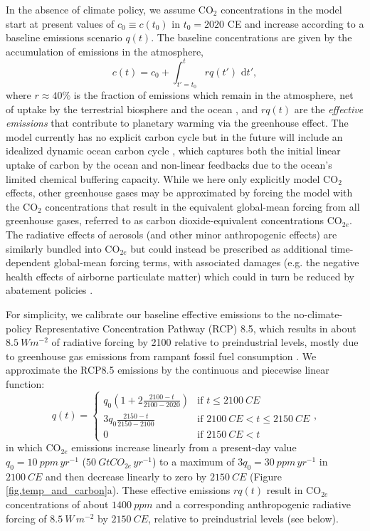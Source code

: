 \documentclass{article}
\begin{document}
In the absence of climate policy, we assume CO$_{2}$ concentrations in the model start at present values of $c_{0} \equiv c(t_{0})$ in $t_{0}=2020$ CE and increase according to a baseline emissions scenario $q(t)$. The baseline concentrations are given by the accumulation of emissions in the atmosphere,
\begin{equation}
c(t) = c_{0} + \int_{t'=t_{0}}^{t} rq(t') \text{ d}t',
\end{equation}
where $r \approx 40\%$ is the fraction of emissions which remain in the atmosphere, net of uptake by the terrestrial biosphere and the ocean \citep{solomon_irreversible_2009}, and $rq(t)$ are the \textit{effective emissions} that contribute to planetary warming via the greenhouse effect. The model currently has no explicit carbon cycle but in the future will include an idealized dynamic ocean carbon cycle \citep{glotter_simple_2014}, which captures both the initial linear uptake of carbon by the ocean and non-linear feedbacks due to the ocean's limited chemical buffering capacity. While we here only explicitly model CO$_{2}$ effects, other greenhouse gases may be approximated by forcing the model with the CO$_{2}$ concentrations that result in the equivalent global-mean forcing from all greenhouse gases, referred to as carbon dioxide-equivalent concentrations CO$_{2e}$. The radiative effects of aerosols (and other minor anthropogenic effects) are similarly bundled into CO$_{2e}$ but could instead be prescribed as additional time-dependent global-mean forcing terms, with associated damages (e.g. the negative health effects of airborne particulate matter) which could in turn be reduced by abatement policies \citep{thompson_systems_2014}.

For simplicity, we calibrate our baseline effective emissions to the no-climate-policy Representative Concentration Pathway (RCP) 8.5, which results in about $\SI{8.5}{W m^{-2}}$ of radiative forcing by 2100 relative to preindustrial levels, mostly due to greenhouse gas emissions from rampant fossil fuel consumption \citep{riahi_scenarios_2007}. We approximate the RCP8.5 emissions by the continuous and piecewise linear function:
\begin{equation}
    q(t) = 
    \begin{cases}
        q_{0}(1 + 2\frac{2100-t}{2100-2020}) &\mbox{if } t \le \SI{2100}{CE} \\
        3q_{0}\frac{2150-t}{2150-2100} &\mbox{if } \SI{2100}{CE} < t \le \SI{2150}{CE} \\
        0 &\mbox{if } \SI{2150}{CE} < t
    \end{cases},\label{eq.baseline_emissions}
\end{equation}
in which CO$_{2e}$ emissions increase linearly from a present-day value $q_{0} = \SI{10}{ppm\, yr^{-1}}$ ($\SI{50}{GtCO_{2e}\, yr^{-1}}$) to a maximum of $3q_{0} = \SI{30}{ppm\, yr^{-1}}$ in $\SI{2100}{CE}$ and then decrease linearly to zero by $\SI{2150}{CE}$ (Figure \ref{fig.temp_and_carbon}a). These effective emissions $rq(t)$ result in CO$_{2e}$ concentrations of about $\SI{1400}{ppm}$ and a corresponding anthropogenic radiative forcing of $\SI{8.5}{W\, m^{-2}}$ by $\SI{2150}{CE}$, relative to preindustrial levels (see below).
\end{document}
